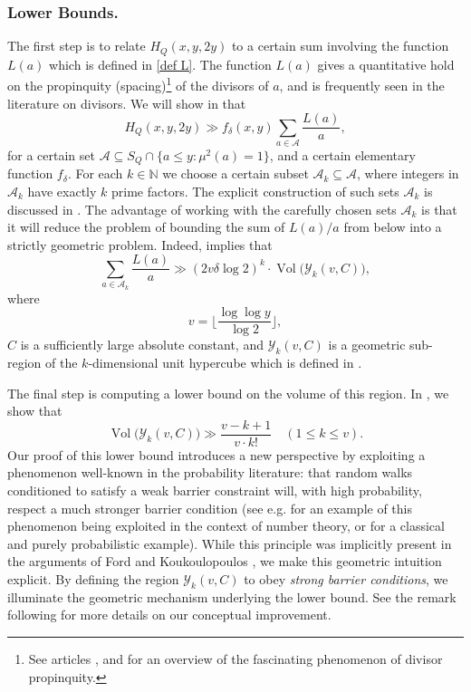 \documentclass{amsart}
\theoremstyle{definition}
\numberwithin{equation}{section}
\newcommand{\N}{\mathbb{N}}
\newcommand{\density}{\delta}
\DeclareMathOperator{\Vol}{Vol}
\begin{document}
		\subsubsection*{Lower Bounds.} The first step is to relate $H_Q(x,y,2y)$ to a certain sum involving the function $L(a)$ which is defined in \eqref{def L}. The function $L(a)$ gives a quantitative hold on the propinquity (spacing)\footnote{See articles \cite{erdHos1979propinquity}, \cite{maier1984set} and \cite{raouj2011mesures} for an overview of the fascinating phenomenon of divisor propinquity.} of the divisors of $a$, and is frequently seen in the literature on divisors. We will show in  that
		\begin{equation}\label{outline eq 1}
			H_Q(x,y,2y) \gg {f}_\density(x,y)\sum_{a \in \mathscr{A}}\frac{L(a)}{a},
		\end{equation}
		for a certain set $\mathscr{A} \subseteq S_Q \cap \{a \leq y : \mu^2(a) = 1\}$, and a certain elementary function $f_\density$. For each $k \in \N$ we choose a certain subset $\mathscr{A}_k \subseteq \mathscr{A}$, where integers in $\mathscr{A}_k$ have exactly $k$ prime factors. The explicit construction of such sets $\mathscr{A}_k$ is discussed in . The advantage of working with the carefully chosen sets $\mathscr{A}_k$ is that it will reduce the problem of bounding the sum of $L(a)/a$ from below into a strictly geometric problem. Indeed,  implies that 
		$$\sum_{a \in \mathscr{A}_k}\frac{L(a)}{a} \gg (2 v \delta \log 2)^k \cdot 
		\Vol\big(\mathcal{Y}_k(v,C)\big),$$
		where $$v = \Big\lfloor\frac{ \log \log y}{\log 2}\Big\rfloor,$$ $C$ is a sufficiently large absolute constant, and $\mathcal{Y}_k(v,C)$ is a geometric sub-region of the $k$-dimensional unit hypercube which is defined in . 
		
		The final step is computing a lower bound on the volume of this region. In , we show that
		$$ \Vol\big(\mathcal{Y}_k(v,C)\big) \gg \frac{v-k+1}{v \cdot k!}\quad (1 \leq k \leq v). $$ 
		Our proof of this lower bound introduces a new perspective by exploiting a phenomenon well-known in the probability literature: that random walks conditioned to satisfy a weak barrier constraint will, with high probability, respect a much stronger barrier condition (see e.g. \cite{arguin2017maxima} for an example of this phenomenon being exploited in the context of number theory, or \cite{bramson1978maximal} for a classical and purely probabilistic example). While this principle was implicitly present in the arguments of Ford \cite{ford2008distribution} and Koukoulopoulos \cite{koukoulopoulos2010generalized}, we make this geometric intuition explicit. By defining the region $\mathcal{Y}_k(v,C)$ to obey \textit{strong barrier conditions}, we illuminate the geometric mechanism underlying the lower bound. See the remark following  for more details on our conceptual improvement.
		
\end{document}
